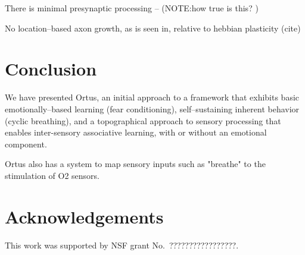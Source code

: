 \documentclass[letterpaper]{article}
\begin{document}
There is minimal presynaptic processing -- (NOTE:how true is this? )

No location--based axon growth, as is seen in, relative to hebbian plasticity (cite)





\section{Conclusion}
We have presented Ortus, an initial approach to a framework that exhibits basic emotionally--based learning (fear conditioning), self--sustaining inherent behavior (cyclic breathing), and a topographical approach to sensory processing that enables inter-sensory associative learning, with or without an emotional component.

Ortus also has a system to map sensory inputs such as "breathe" to the stimulation of O2 sensors.






\section{Acknowledgements}

This work was supported by NSF grant No.\ ?????????????????.

\footnotesize

\end{document}
